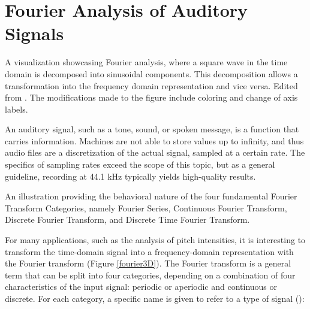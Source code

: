 \setcounter{chapter}{0}
\chapter{Fourier Analysis of Auditory Signals}
\label{chap:fourier}

\begin{marginfigure}
    \centering
    \vspace{1cm}
    \vspace{0.05cm}
    \caption{A visualization showcasing Fourier analysis, where a square wave in the time domain is decomposed into sinusoidal components. This decomposition allows a transformation into the frequency domain representation and vice versa. Edited from \textcite{neutelings_fourier_2021}. The modifications made to the figure include coloring and change of axis labels.}
    \label{fourier3D} 
    \vspace{0.3cm}
\end{marginfigure}


An auditory signal, such as a tone, sound, or spoken message, is a function that carries information. Machines are not able to store values up to infinity, and thus audio files are a discretization of the actual signal, sampled at a certain rate. The specifics of sampling rates exceed the scope of this topic, but as a general guideline, recording at 44.1 kHz typically yields high-quality results\sidenotemark{}.

\begin{marginfigure}
\centering
\vspace{0.6cm}

\vspace{0.3cm}
\caption{An illustration providing the behavioral nature of the four fundamental Fourier Transform Categories, namely Fourier Series, Continuous Fourier Transform, Discrete Fourier Transform, and Discrete Time Fourier Transform.}
\label{typesFourier} 
\end{marginfigure} 

For many applications, such as the analysis of pitch intensities, it is interesting to transform the time-domain signal into a frequency-domain representation with the Fourier transform (Figure \ref{fourier3D}).
The Fourier transform is a general term that can be split into four categories, depending on a combination of four characteristics of the input signal: periodic or aperiodic and continuous or discrete. For each category, a specific name is given to refer to a type of signal (\cite{smith_scientist_1997}):

